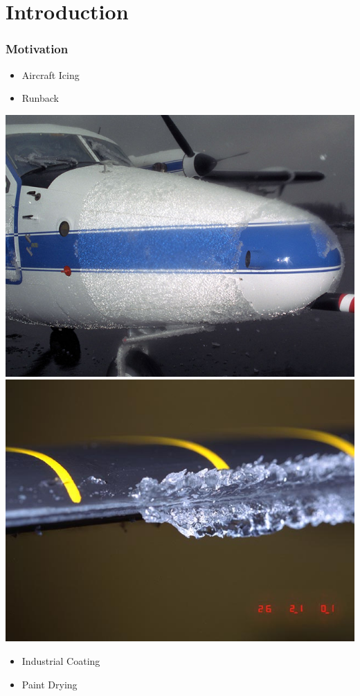 \documentclass[10pt]{beamer}
\begin{document}
  \section{Introduction}
    \begin{frame}
      \frametitle{Motivation}
      \begin{itemize}
        \item Aircraft Icing
        \item Runback
      \end{itemize}
      \begin{center}
        \includegraphics[scale=0.2]{Figures/Icing_on_a_plane.jpg}
        \hspace{0.1in}
        \includegraphics[scale=0.2]{Figures/Icing_on_a_rotor.jpg}
      \end{center}
      \begin{itemize}
        \item Industrial Coating
        \item Paint Drying
      \end{itemize}
    \end{frame}
\end{document}

